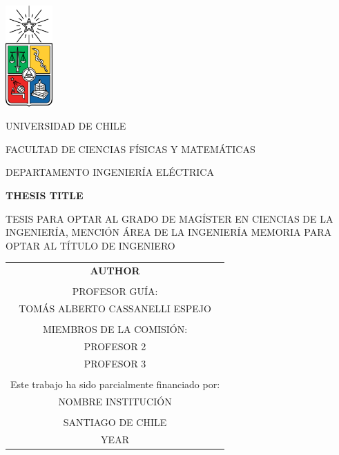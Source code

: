 \documentclass[
	12pt,
	letterpaper,
  oneside
  ]{book}
\begin{document}
  \thispagestyle{empty}
	\def\arraystretch{1.15}
  
  \begin{minipage}[t]{0.125\linewidth}
    \includegraphics[width=1.8cm]{uchile}
  \end{minipage}
  \begin{minipage}[b]{0.8\linewidth}
    \MakeUppercase{Universidad de Chile}

    \MakeUppercase{Facultad de Ciencias Físicas y Matemáticas}

    \MakeUppercase{Departamento Ingeniería Eléctrica}
	\end{minipage}

	\begin{center}
    \vspace{1.5cm}

    \MakeUppercase{\textbf{Thesis Title}}

    \vspace{1.5cm}

    \MakeUppercase{Tesis para optar al grado de magíster en ciencias de la ingeniería, mención área de la ingeniería}
	  \bigbreak\vspace{0.3cm}
    \MakeUppercase{Memoria para optar al título de ingeniero}
	
    \vfill

    \begin{tabular}{c}
      \MakeUppercase{\textbf{Author}} \\
      \vspace{1.0cm} \\
      PROFESOR GUÍA: \\
      TOMÁS ALBERTO CASSANELLI ESPEJO \\
      \vspace{0.5cm} \\
      MIEMBROS DE LA COMISIÓN: \\
      PROFESOR 2 \\
      PROFESOR 3 \\
      \vspace{0.5cm} \\
      Este trabajo ha sido parcialmente financiado por: \\
      NOMBRE INSTITUCIÓN \\
      \vspace{0.5cm} \\
      \MakeUppercase{Santiago de Chile} \\
      \MakeUppercase{year}
    \end{tabular}

	\end{center}
\end{document}
